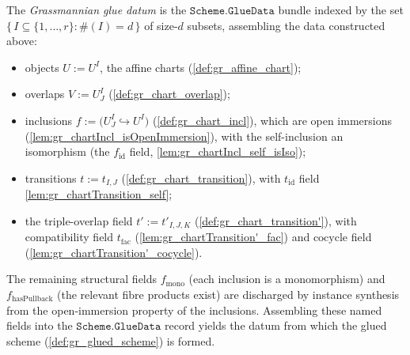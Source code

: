 \begin{definition}\leanok
  \label{def:gr_the_glue_data}
  The \emph{Grassmannian glue datum} is the \(\mathtt{Scheme.GlueData}\) bundle
  indexed by the set \(\{\, I \subseteq \{1,\dots,r\} : \#(I) = d \,\}\) of
  size-\(d\) subsets, assembling the data constructed above:
  \begin{itemize}
    \item objects \(U := U^I\), the affine charts (\cref{def:gr_affine_chart});
    \item overlaps \(V := U^I_J\) (\cref{def:gr_chart_overlap});
    \item inclusions \(f := \bigl(U^I_J \hookrightarrow U^I\bigr)\)
      (\cref{def:gr_chart_incl}), which are open immersions
      (\cref{lem:gr_chartIncl_isOpenImmersion}), with the self-inclusion an
      isomorphism (the \(f_{\mathrm{id}}\) field,
      \cref{lem:gr_chartIncl_self_isIso});
    \item transitions \(t := t_{I,J}\) (\cref{def:gr_chart_transition}), with
      \(t_{\mathrm{id}}\) field \cref{lem:gr_chartTransition_self};
    \item the triple-overlap field \(t' := t'_{I,J,K}\)
      (\cref{def:gr_chart_transition'}), with compatibility field
      \(t_{\mathrm{fac}}\) (\cref{lem:gr_chartTransition'_fac}) and \(\mathrm{cocycle}\)
      field (\cref{lem:gr_chartTransition'_cocycle}).
  \end{itemize}
  The remaining structural fields \(f_{\mathrm{mono}}\) (each inclusion is a
  monomorphism) and \(f_{\mathrm{hasPullback}}\) (the relevant fibre products
  exist) are discharged by instance synthesis from the open-immersion property of
  the inclusions. Assembling these named fields into the
  \(\mathtt{Scheme.GlueData}\) record yields the datum from which the glued scheme
  (\cref{def:gr_glued_scheme}) is formed.
\end{definition}

